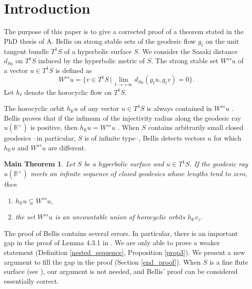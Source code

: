 \documentclass[a4paper,english,reqno]{amsart}
\newtheorem*{theoremA*}{Main Theorem}
\theoremstyle{definition}
\numberwithin{equation}{section}
\begin{document}
	\section{Introduction}
	The purpose of this paper is to give a corrected proof of a theorem stated in the PhD thesis of A. Bellis \cite[Th�or�me E]{Bellis} on strong stable sets of the geodesic flow $g_t$ on the unit tangent bundle $T^1 S$ of a hyperbolic surface $S$. We consider the Sasaki distance $d_{Sa}$ on $T^1 S$ induced by the hyperbolic metric of $S$. The strong stable set $W^{ss}u$ of a vector $u\in T^1S$ is defined as 
	\[
	W^{ss}u = \{ v\in T^1S \, | \, \lim\limits_{t\to +\infty} d_{Sa}(g_tu,g_tv)=0  \}.
	\]
	Let $h_t$ denote the horocyclic flow on $T^1 S$.
	
	The horocyclic orbit $h_{\mathbb{R}} u$ of any vector $u\in T^1S$ is always contained in $W^{ss} u$ \cite{Dalbo}. Bellis proves that if the infimum of the injectivity radius along the geodesic ray $u(\mathbb{R}^+)$ is positive, then $h_{\mathbb{R}} u = W^{ss} u$ \cite[Th�or�me D]{Bellis}. When $S$ contains arbitrarily small closed geodesics --in particular, $S$ is of infinite type--, Bellis detects vectors $u$ for which $h_{\mathbb{R}} u$ and  $W^{ss} u$ are different.
	
	\begin{theoremA*}\label{thE} \cite[Th�or�me E]{Bellis}
		Let $S$ be a hyperbolic surface and $u\in T^1S$. If the geodesic ray $u(\mathbb{R}^+)$ meets an infinite sequence of closed geodesics whose lengths tend to zero, then
		\begin{enumerate}
			\item $h_{\mathbb{R}} u\subsetneq W^{ss}u$,
			\item the set $W^{ss}u $ is an uncountable union of horocyclic orbits $h_{\mathbb{R}} v_i$.
		\end{enumerate} 
	\end{theoremA*}
	
	The proof of Bellis contains several errors. In particular, there is an important gap in the proof of Lemma 4.3.1 in \cite{Bellis}. We are only able to prove a weaker statement (Definition \ref{nested_sequence}, Proposition \ref{prop3}). We present a new argument to fill the gap in the proof (Section \ref{end_proof}). When $S$ is a fine flute surface (see \cite[Section 1.4.1]{Bellis}), our argument is not needed, and Bellis' proof can be considered essentially correct.
	
\end{document}
